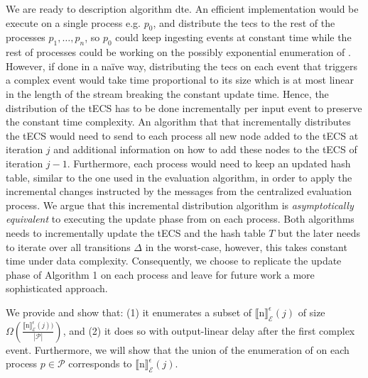 We are ready to description algorithm \acrshort{dte}. An efficient implementation would be execute \cite[Algorithm 1]{core} on a single process e.g. $p_{0}$, and distribute the \acrshort{tecs} \tecs to the rest of the processes $p_{1}, \ldots, p_{n}$, so $p_{0}$ could keep ingesting events at constant time while the rest of processes could be working on the possibly exponential enumeration of \tecs. However, if done in a na\"ive way, distributing the \acrshort{tecs} on each event that triggers a complex event would take time proportional to its size which is at most linear in the length of the stream breaking the constant update time. Hence, the distribution of the tECS has to be done incrementally per input event to preserve the constant time complexity. An algorithm that that incrementally distributes the tECS would need to send to each process all new node added to the tECS at iteration $j$ and additional information on how to add these nodes to the tECS of iteration $j-1$. Furthermore, each process would need to keep an updated hash table, similar to the one used in the evaluation algorithm, in order to apply the incremental changes instructed by the messages from the centralized evaluation process. We argue that this incremental distribution algorithm is \emph{asymptotically equivalent} to executing the update phase from \cite[Algorithm 1]{core} on each process. Both algorithms needs to incrementally update the tECS and the hash table $T$ but the later needs to iterate over all transitions $\Delta$ in the worst-case, however, this takes constant time under data complexity. Consequently, we choose to replicate the update phase of Algorithm 1 on each process and leave for future work a more sophisticated approach.

\newpage

We provide  and show that: (1) it enumerates a subset of ${\llbracket \text{n} \rrbracket}^{\epsilon}_{\mathcal{E}}(j)$ of size $\Omega(\frac{{\llbracket \text{n} \rrbracket}^{\epsilon}_{\mathcal{E}}(j))}{|\mathcal{P}|})$, and (2) it does so with output-linear delay after the first complex event. Furthermore, we will show that the union of the enumeration of  on each process $p \in \mathcal{P}$ corresponds to ${\llbracket \text{n} \rrbracket}^{\epsilon}_{\mathcal{E}}(j)$.

